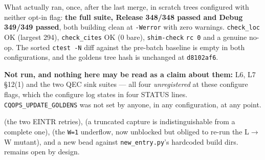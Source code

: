 What actually ran, once, after the last merge, in scratch trees configured with neither opt-in
flag: \textbf{the full suite, Release 348/348 passed and Debug 349/349 passed}, both building
clean at \texttt{-Werror} with zero warnings. \texttt{check\_loc} OK (largest 294),
\texttt{check\_cites} OK (0 bare), \texttt{shim-check} \texttt{rc 0} and a genuine no-op. The
sorted \texttt{ctest -N} diff against the pre-batch baseline is empty in both configurations,
and the goldens tree hash is unchanged at \texttt{d8102af6}.

\textbf{Not run, and nothing here may be read as a claim about them:} L6, L7 §12(1) and the two
QEC sink suites --- all four \emph{unregistered} at these configure flags, which the configure
log states in four STATUS lines. \texttt{CQOPS\_UPDATE\_GOLDENS} was not set by anyone, in any
configuration, at any point.

 (the two EINTR retries),  (a truncated capture is indistinguishable from a
complete one),  (the \texttt{W=1} underflow, now unblocked but obliged to re-run the
L$\rightarrow$W mutant), and a new bead against \texttt{new\_entry.py}'s hardcoded build dirs.
 remains open by design.
